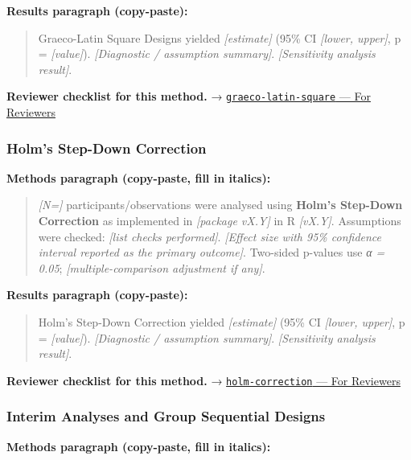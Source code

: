 \documentclass[
]{article}
\begin{document}
\textbf{Results paragraph (copy-paste):}

\begin{quote}
Graeco-Latin Square Designs yielded \emph{{[}estimate{]}} (95\% CI
\emph{{[}lower, upper{]}}, p = \emph{{[}value{]}}). \emph{{[}Diagnostic
/ assumption summary{]}}. \emph{{[}Sensitivity analysis result{]}}.
\end{quote}

\textbf{Reviewer checklist for this method.} →
\href{../chapters/16-design/graeco-latin-square.Rmd\#for-reviewers}{\texttt{graeco-latin-square}
--- For Reviewers}

\subsubsection{Holm's Step-Down
Correction}\label{holms-step-down-correction}

\textbf{Methods paragraph (copy-paste, fill in italics):}

\begin{quote}
\emph{{[}N={]}} participants/observations were analysed using
\textbf{Holm's Step-Down Correction} as implemented in \emph{{[}package
vX.Y{]}} in R \emph{{[}vX.Y{]}}. Assumptions were checked: \emph{{[}list
checks performed{]}}. \emph{{[}Effect size with 95\% confidence interval
reported as the primary outcome{]}}. Two-sided p-values use \emph{α =
0.05}; \emph{{[}multiple-comparison adjustment if any{]}}.
\end{quote}

\textbf{Results paragraph (copy-paste):}

\begin{quote}
Holm's Step-Down Correction yielded \emph{{[}estimate{]}} (95\% CI
\emph{{[}lower, upper{]}}, p = \emph{{[}value{]}}). \emph{{[}Diagnostic
/ assumption summary{]}}. \emph{{[}Sensitivity analysis result{]}}.
\end{quote}

\textbf{Reviewer checklist for this method.} →
\href{../chapters/04-inferential/holm-correction.Rmd\#for-reviewers}{\texttt{holm-correction}
--- For Reviewers}

\subsubsection{Interim Analyses and Group Sequential
Designs}\label{interim-analyses-and-group-sequential-designs}

\textbf{Methods paragraph (copy-paste, fill in italics):}
\end{document}
